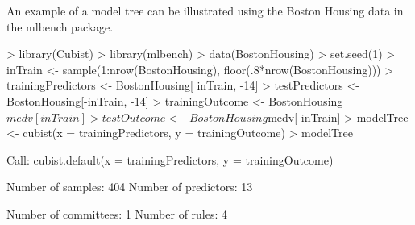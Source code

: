 \documentclass[12pt]{article}
\newcommand{\pkg}[1]{{\fontseries{b}\selectfont #1}}
\renewcommand{\pkg}[1]{{\textsf{#1}}}
\renewenvironment{Schunk}{\vspace{\topsep}}{\vspace{\topsep}}
\begin{document}
An example of a model tree can be illustrated using the Boston Housing data in the \pkg{mlbench} package.
\begin{Schunk}
\begin{Sinput}
> library(Cubist)
> library(mlbench)
> data(BostonHousing)
> set.seed(1)
> inTrain <- sample(1:nrow(BostonHousing), floor(.8*nrow(BostonHousing)))
> trainingPredictors <- BostonHousing[ inTrain, -14]
> testPredictors     <- BostonHousing[-inTrain, -14]
> trainingOutcome <- BostonHousing$medv[ inTrain]
> testOutcome     <- BostonHousing$medv[-inTrain]
> modelTree <- cubist(x = trainingPredictors, y = trainingOutcome)
> modelTree
\end{Sinput}
\begin{Soutput}
Call:
cubist.default(x = trainingPredictors, y = trainingOutcome)

Number of samples: 404 
Number of predictors: 13 

Number of committees: 1 
Number of rules: 4 
\end{Soutput}
\end{Schunk}
\end{document}
